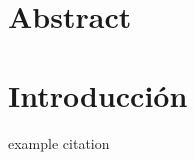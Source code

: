 \documentclass[12pt]{book}
\begin{document}
    




\section*{Abstract}


\tableofcontents





\section{Introducción}
example citation \cite{shaham2018defending}





\printbibliography
\end{document}
